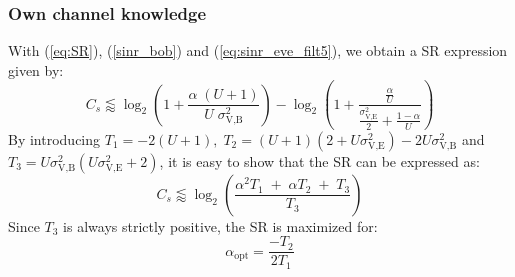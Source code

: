 \documentclass[journal,comsoc]{IEEEtran}
\begin{document}
\subsubsection{Own channel knowledge}
With (\ref{eq:SR}), (\ref{sinr_bob}) and (\ref{eq:sinr_eve_filt5}), we obtain a SR expression given by:
\begin{equation}
C_s \lessapprox \log_2 \left( 1 +  \frac{\alpha \;(U+1)}{U \; \sigma_{\text{V,B}}^2} \right) - \log_2\left( 1 +  \frac{\frac{\alpha }{U}}{\frac{\sigma^2_{\text{V,E}}}{2} + \frac{1-\alpha}{U}}\right)
\label{eq:SR_anal2_decod_5}
\end{equation}
By introducing $T_1=-2(U+1),  \; T_2 = (U+1)(2+U\sigma_{\text{V,E}}^2) - 2U\sigma_{\text{V,B}}^2 $ and $T_3 = U\sigma_{\text{V,B}}^2(U\sigma_{\text{V,E}}^2+2)$, it is easy to show that the SR can be expressed as:
\begin{equation}
C_s \lessapprox \log_2 \left( \frac{\alpha^2 T_1 \; + \; \alpha T_2 \; + \; T_3}{T_3} \right)
\label{eq:SR_anal3_decod_5}
\end{equation}
Since $T_3$ is always strictly positive, the SR is maximized for:
\begin{equation}
\alpha_{\text{opt}} = \frac{-T_2}{2T_1}
\label{eq:optimal_alpha_decod_5}
\end{equation}


\end{document}
